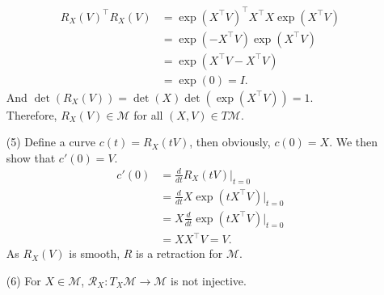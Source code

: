 \documentclass[en, oneside]{assignment}
\begin{document}
\begin{sol}
\begin{itemize}
\begin{align*}
            R_X(V)^\top R_X(V) & = \exp(X^\top V)^\top X^\top X \exp(X^\top V)\\
            & = \exp(-X^\top V) \exp(X^\top V)\\
            & = \exp(X^\top V - X^\top V)\\
            & = \exp(0) = I.
        \end{align*}
        And $\det(R_X(V)) = \det(X) \det(\exp(X^\top V)) = 1$.\\
        Therefore, $R_X(V) \in \mathcal{M}$ for all $(X, V) \in T\mathcal{M}$.
        \item[(5)] Define a curve $c(t) = R_X(tV)$, then obviously, $c(0) = X$. We then show that $c'(0) = V$.\\
        \begin{align*}
            c'(0) & = \frac{d}{dt} R_X(tV)|_{t=0}\\
            & = \frac{d}{dt} X \exp(tX^\top V)|_{t=0}\\
            & = X \frac{d}{dt} \exp(tX^\top V)|_{t=0}\\
            & = X X^\top V = V.
        \end{align*}
        As $R_X(V)$ is smooth, $R$ is a retraction for $\mathcal{M}$.
        \item[(6)] For $X \in \mathcal{M}$, $\mathcal{R}_X: T_X\mathcal{M} \to \mathcal{M}$ is not injective.
    \end{itemize}
\end{sol}
\end{document}
